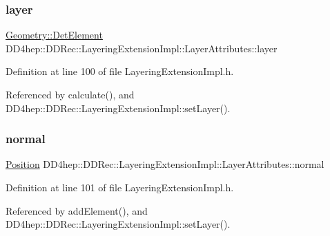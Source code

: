 \subsubsection{\texorpdfstring{layer}{layer}}
{\footnotesize\ttfamily \hyperlink{class_d_d4hep_1_1_geometry_1_1_det_element}{Geometry\+::\+Det\+Element} D\+D4hep\+::\+D\+D\+Rec\+::\+Layering\+Extension\+Impl\+::\+Layer\+Attributes\+::layer}



Definition at line 100 of file Layering\+Extension\+Impl.\+h.



Referenced by calculate(), and D\+D4hep\+::\+D\+D\+Rec\+::\+Layering\+Extension\+Impl\+::set\+Layer().

\hypertarget{struct_d_d4hep_1_1_d_d_rec_1_1_layering_extension_impl_1_1_layer_attributes_a9920dfca99a6c4fc644a03ad650d1ffb}{}\label{struct_d_d4hep_1_1_d_d_rec_1_1_layering_extension_impl_1_1_layer_attributes_a9920dfca99a6c4fc644a03ad650d1ffb} 
\subsubsection{\texorpdfstring{normal}{normal}}
{\footnotesize\ttfamily \hyperlink{class_d_d4hep_1_1_d_d_rec_1_1_layering_extension_impl_a34281f7585bbe0d61654c9924e2789e3}{Position} D\+D4hep\+::\+D\+D\+Rec\+::\+Layering\+Extension\+Impl\+::\+Layer\+Attributes\+::normal}



Definition at line 101 of file Layering\+Extension\+Impl.\+h.



Referenced by add\+Element(), and D\+D4hep\+::\+D\+D\+Rec\+::\+Layering\+Extension\+Impl\+::set\+Layer().

\hypertarget{struct_d_d4hep_1_1_d_d_rec_1_1_layering_extension_impl_1_1_layer_attributes_ac5d8747f913962efd864c527e5f58e5b}{}\label{struct_d_d4hep_1_1_d_d_rec_1_1_layering_extension_impl_1_1_layer_attributes_ac5d8747f913962efd864c527e5f58e5b} 
